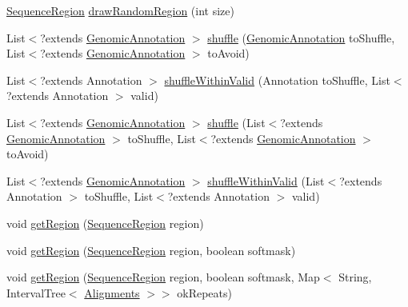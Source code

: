 \begin{DoxyCompactItemize}
\hyperlink{classbroad_1_1core_1_1sequence_1_1_sequence_region}{Sequence\+Region} \hyperlink{classbroad_1_1pda_1_1feature_1_1genome_1_1_chromosome_ae153c5676ae01d77b0edab7d0d84ca52}{draw\+Random\+Region} (int size)
\item 
List$<$?extends \hyperlink{interfacebroad_1_1core_1_1annotation_1_1_genomic_annotation}{Genomic\+Annotation} $>$ \hyperlink{classbroad_1_1pda_1_1feature_1_1genome_1_1_chromosome_a4c4be3e0aa711b3aec171098b3f59bdf}{shuffle} (\hyperlink{interfacebroad_1_1core_1_1annotation_1_1_genomic_annotation}{Genomic\+Annotation} to\+Shuffle, List$<$?extends \hyperlink{interfacebroad_1_1core_1_1annotation_1_1_genomic_annotation}{Genomic\+Annotation} $>$ to\+Avoid)
\item 
List$<$?extends Annotation $>$ \hyperlink{classbroad_1_1pda_1_1feature_1_1genome_1_1_chromosome_a4917f594bc4c2b69fd29bd0ba3e0cfce}{shuffle\+Within\+Valid} (Annotation to\+Shuffle, List$<$?extends Annotation $>$ valid)
\item 
List$<$?extends \hyperlink{interfacebroad_1_1core_1_1annotation_1_1_genomic_annotation}{Genomic\+Annotation} $>$ \hyperlink{classbroad_1_1pda_1_1feature_1_1genome_1_1_chromosome_ae586acf35ef1b6073e1cec60ce87c420}{shuffle} (List$<$?extends \hyperlink{interfacebroad_1_1core_1_1annotation_1_1_genomic_annotation}{Genomic\+Annotation} $>$ to\+Shuffle, List$<$?extends \hyperlink{interfacebroad_1_1core_1_1annotation_1_1_genomic_annotation}{Genomic\+Annotation} $>$ to\+Avoid)
\item 
List$<$?extends \hyperlink{interfacebroad_1_1core_1_1annotation_1_1_genomic_annotation}{Genomic\+Annotation} $>$ \hyperlink{classbroad_1_1pda_1_1feature_1_1genome_1_1_chromosome_aa9787193ba53f019fc520ec75ca9ccaf}{shuffle\+Within\+Valid} (List$<$?extends Annotation $>$ to\+Shuffle, List$<$?extends Annotation $>$ valid)
\item 
void \hyperlink{classbroad_1_1pda_1_1feature_1_1genome_1_1_chromosome_a43a6cf2a9046106d068032d1533fc60e}{get\+Region} (\hyperlink{classbroad_1_1core_1_1sequence_1_1_sequence_region}{Sequence\+Region} region)
\item 
void \hyperlink{classbroad_1_1pda_1_1feature_1_1genome_1_1_chromosome_af7aa93d4a424232557e29973f26e204a}{get\+Region} (\hyperlink{classbroad_1_1core_1_1sequence_1_1_sequence_region}{Sequence\+Region} region, boolean softmask)
\item 
void \hyperlink{classbroad_1_1pda_1_1feature_1_1genome_1_1_chromosome_ac6ad6bbfb8193354237bb24ea6844448}{get\+Region} (\hyperlink{classbroad_1_1core_1_1sequence_1_1_sequence_region}{Sequence\+Region} region, boolean softmask, Map$<$ String, Interval\+Tree$<$ \hyperlink{classbroad_1_1pda_1_1datastructures_1_1_alignments}{Alignments} $>$$>$ ok\+Repeats)
$$
\end{DoxyCompactItemize}
